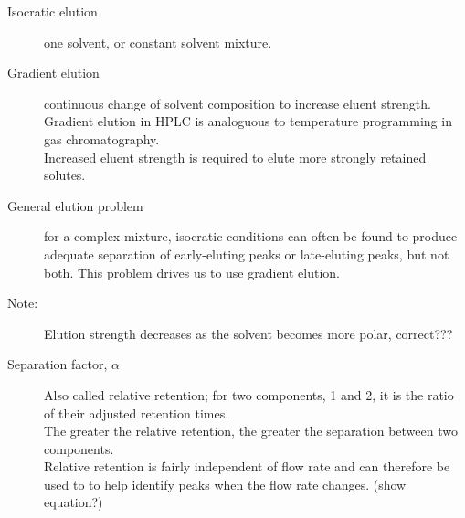 \documentclass[a4paper, 12pt]{article}
\begin{document}
\begin{description}
	\item[Isocratic elution] one solvent, or constant solvent mixture.
	\item[Gradient elution] continuous change of solvent composition to increase eluent strength. \\ Gradient elution in HPLC is analoguous to temperature programming in gas chromatography. \\ Increased eluent strength is required to elute more strongly retained solutes.
	\item[General elution problem] for a complex mixture, isocratic conditions can often be found to produce adequate separation of early-eluting peaks or late-eluting peaks, but not both. This problem drives us to use gradient elution.
	\item[Note:] Elution strength decreases as the solvent becomes more polar, correct???
	\item[Separation factor, $\alpha$] Also called relative retention; for two components, 1 and 2, it is the ratio of their adjusted retention times. \\ The greater the relative retention, the greater the separation between two components. \\ Relative retention is fairly independent of flow rate and can therefore be used to to help identify peaks when the flow rate changes. (show equation?)
\end{description}
\end{document}
